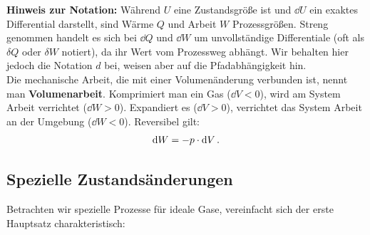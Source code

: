 \noindent\textbf{Hinweis zur Notation:} Während $U$ eine Zustandsgröße ist und $\dd U$ ein exaktes Differential darstellt, sind Wärme $Q$ und Arbeit $W$ Prozessgrößen. Streng genommen handelt es sich bei $\dd Q$ und $\dd W$ um unvollständige Differentiale (oft als $\delta Q$ oder $\delta W$ notiert), da ihr Wert vom Prozessweg abhängt. Wir behalten hier jedoch die Notation $d$ bei, weisen aber auf die Pfadabhängigkeit hin.\\

Die mechanische Arbeit, die mit einer Volumenänderung verbunden ist, nennt man \textbf{Volumenarbeit}. Komprimiert man ein Gas ($\dd V < 0$), wird am System Arbeit verrichtet ($\dd W > 0$). Expandiert es ($\dd V > 0$), verrichtet das System Arbeit an der Umgebung ($\dd W < 0$). Reversibel gilt:
\begin{equation}\label{eq: volumenarbeit}
    \mathrm{d} W = -p \cdot \mathrm{d} V \,.
\end{equation}

\subsection{Spezielle Zustandsänderungen}\label{subsec: spezielle_zustaende}
Betrachten wir spezielle Prozesse für ideale Gase, vereinfacht sich der erste Hauptsatz charakteristisch:

